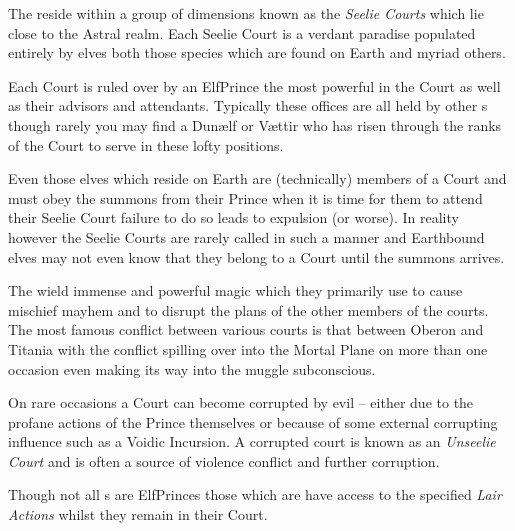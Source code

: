 {{The \name{} reside within a group of dimensions known as the {\it Seelie Courts}\comma{} which lie close to the Astral realm. Each Seelie Court is a verdant paradise\comma{} populated entirely by elves\comma{} both those species which are found on Earth\comma{} and myriad others.

Each Court is ruled over by an Elf\minus{}Prince\comma{} the most powerful \name{} in the Court\comma{} as well as their advisors and attendants. Typically these offices are all held by other \name{}s\comma{} though rarely you may find a Dun\ae{}lf or V\ae{}ttir who has risen through the ranks of the Court to serve in these lofty positions. 

Even those elves which reside on Earth are (technically) members of a Court\comma{} and must obey the summons from their Prince when it is time for them to attend their Seelie Court\comma{} failure to do so leads to expulsion (or worse). In reality\comma{} however\comma{} the Seelie Courts are rarely called in such a manner and Earthbound elves may not even know that they belong to a Court until the summons arrives. 

The \name{} wield immense and powerful magic\comma{} which they primarily use to cause mischief\comma{} mayhem and to disrupt the plans of the other members of the courts. The most famous conflict between various courts is that between Oberon and Titania\comma{} with the conflict spilling over into the Mortal Plane on more than one occasion\comma{} even making its way into the muggle subconscious. 

On rare occasions a Court can become corrupted by evil – either due to the profane actions of the Prince themselves\comma{} or because of some external corrupting influence such as a Voidic Incursion. A corrupted court is known as an {\it Unseelie Court}\comma{} and is often a source of violence\comma{} conflict and further corruption. 

Though not all \name{}s are Elf\minus{}Princes\comma{} those which are have access to the specified {\it Lair Actions} whilst they remain in their Court.}



}




